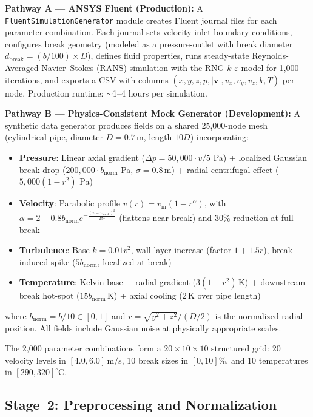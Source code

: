 \documentclass[journal]{IEEEtran}
\begin{document}
\textbf{Pathway A --- ANSYS Fluent (Production):}
A \texttt{FluentSimulationGenerator} module creates Fluent journal files for each parameter combination. Each journal sets velocity-inlet boundary conditions, configures break geometry (modeled as a pressure-outlet with break diameter $d_\text{break} = (b/100) \times D$), defines fluid properties, runs steady-state Reynolds-Averaged Navier--Stokes (RANS) simulation with the RNG $k$-$\varepsilon$ model for 1,000 iterations, and exports a CSV with columns $(x, y, z, p, |\bm{v}|, v_x, v_y, v_z, k, T)$ per node. Production runtime: $\sim$1--4 hours per simulation.

\textbf{Pathway B --- Physics-Consistent Mock Generator (Development):}
A synthetic data generator produces fields on a shared 25,000-node mesh (cylindrical pipe, diameter $D = 0.7$\,m, length $10D$) incorporating:
\begin{itemize}
    \item \textbf{Pressure}: Linear axial gradient ($\Delta p = 50{,}000 \cdot v/5$ Pa) + localized Gaussian break drop ($200{,}000 \cdot b_\text{norm}$ Pa, $\sigma = 0.8$\,m) + radial centrifugal effect ($5{,}000(1 - r^2)$ Pa)
    \item \textbf{Velocity}: Parabolic profile $v(r) = v_\text{in}(1 - r^{\alpha})$, with $\alpha = 2 - 0.8 b_\text{norm} e^{-\frac{(x - x_\text{break})^2}{2\sigma^2}}$ (flattens near break) and 30\% reduction at full break
    \item \textbf{Turbulence}: Base $k = 0.01 v^2$, wall-layer increase (factor $1 + 1.5r$), break-induced spike ($5 b_\text{norm}$, localized at break)
    \item \textbf{Temperature}: Kelvin base + radial gradient ($3(1-r^2)$\,K) + downstream break hot-spot ($15 b_\text{norm}$\,K) + axial cooling (2\,K over pipe length)
\end{itemize}
where $b_\text{norm} = b/10 \in [0,1]$ and $r = \sqrt{y^2 + z^2}/(D/2)$ is the normalized radial position. All fields include Gaussian noise at physically appropriate scales.

The 2,000 parameter combinations form a $20 \times 10 \times 10$ structured grid: 20 velocity levels in $[4.0, 6.0]$\,m/s, 10 break sizes in $[0, 10]$\%, and 10 temperatures in $[290, 320]^\circ$C.

\subsection{Stage~2: Preprocessing and Normalization}
\end{document}
